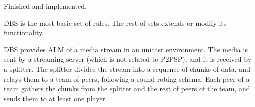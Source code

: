 
\label{sec:DBS}

\begin{notex}
  Finished and implemented.
\end{notex}

\acrshort{DBS} is the most basic set of rules. The rest of sets extends or modify
its functionality.

DBS provides \acrshort{ALM} of a \gls{media} \gls{stream} in an
\gls{unicast} environment. The media is sent by a streaming
\gls{server} (which is not related to P2PSP), and it
is received by a \gls{splitter}. The
splitter divides the stream into a sequence of \gls{chunk}s of data,
and relays them to a \gls{team} of peers, following a round-robing
schema. Each peer of a team gathers the chunks from the splitter and
the rest of peers of the team, and sends them to at least one
\gls{player}.

\begin{comment}
In single layered streams\footnote{Each layer of a
  scalable stream is received by a different peer attached to the same
  player capable or render scalable media.}, each peer is spawned by a
player (normal users should not run peers directly).
\end{comment}

\begin{comment}
/* quitar: We define the set of teams as
$\{T\}$,
and enumerate the peers in the team $T$ as $T=\{P_1,\cdots,P_{|T|}\}$. */
\end{comment}
